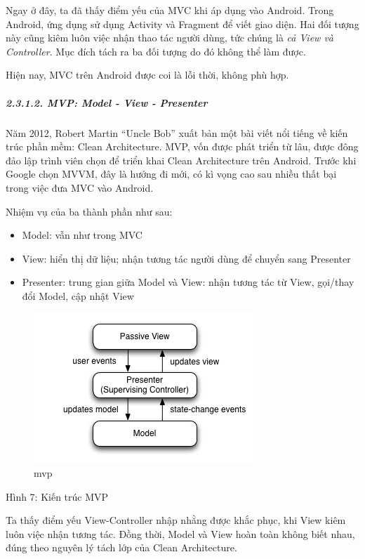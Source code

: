 \documentclass[
]{article}
\providecommand{\tightlist}{%
  \setlength{\itemsep}{0pt}\setlength{\parskip}{0pt}}
\begin{document}
Ngay ở đây, ta đã thấy điểm yếu của MVC khi áp dụng vào Android. Trong
Android, ứng dụng sử dụng Activity và Fragment để viết giao diện. Hai
đối tượng này cũng kiêm luôn việc nhận thao tác người dùng, tức chúng là
\emph{cả View và Controller}. Mục đích tách ra ba đối tượng do đó không
thể làm được.

Hiện nay, MVC trên Android được coi là lỗi thời, không phù hợp.

\hypertarget{mvp-model---view---presenter}{%
\subparagraph{2.3.1.2. MVP: Model - View -
Presenter}\label{mvp-model---view---presenter}}

Năm 2012, Robert Martin ``Uncle Bob'' xuất bản một bài viết nổi tiếng về
kiến trúc phần mềm: Clean Architecture. MVP, vốn được phát triển từ lâu,
được đông đảo lập trình viên chọn để triển khai Clean Architecture trên
Android. Trước khi Google chọn MVVM, đây là hướng đi mới, có kì vọng cao
sau nhiều thất bại trong việc đưa MVC vào Android.

Nhiệm vụ của ba thành phần như sau:

\begin{itemize}
\tightlist
\item
  Model: vẫn như trong MVC
\item
  View: hiển thị dữ liệu; nhận tương tác người dùng để chuyển sang
  Presenter
\item
  Presenter: trung gian giữa Model và View: nhận tương tác từ View,
  gọi/thay đổi Model, cập nhật View
\end{itemize}

\begin{figure}
\centering
\includegraphics{../images/Model_View_Presenter_GUI_Design_Pattern.png}
\caption{mvp}
\end{figure}

Hình 7: Kiến trúc MVP

Ta thấy điểm yếu View-Controller nhập nhằng được khắc phục, khi View
kiêm luôn việc nhận tương tác. Đồng thời, Model và View hoàn toàn không
biết nhau, đúng theo nguyên lý tách lớp của Clean Architecture.
\end{document}
